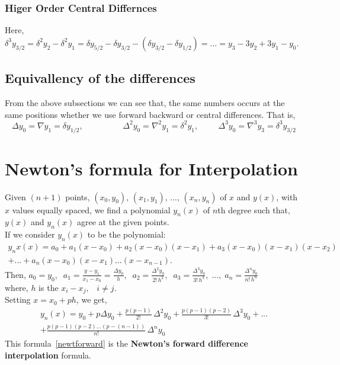 \documentclass[aima203_lecturenotes_ku.tex]{subfiles}
\begin{document}
\subsubsection{Higer Order Central Differnces}
Here, $\delta ^3 y_{3/2} = \delta ^2 y_2 - \delta ^2 y_1 = \delta y_{5/2} - \delta y_{3/2}-(\delta y_{3/2} - \delta y_{1/2}) = ... = y_3 - 3y_2 + 3y_1- y_0$.

\subsection{Equivallency of the differences}
From the above subsections we can see that, the same numbers occurs at the same positions whether we use forward backward or central differences. That is, $$\Delta y_0 = \nabla y_1 = \delta y_{1/2}, \hspace{2cm} \Delta^2 y_0 = \nabla ^2 y_1 = \delta ^2 y_1, \hspace{1cm} \Delta ^3 y_0 = \nabla ^3 y_3 = \delta ^3 y_{3/2} $$

\section{Newton's formula for Interpolation}
Given $(n+1)$ points, $(x_0,y_0), \, (x_1,y_1), \, ..., \, (x_n,y_n)$ of $x$ and $y(x)$, with $x$ values equally spaced, we find a polynomial $y_n(x)$ of $n$th degree such that, $y(x)$ and $y_n(x)$ agree at the given points. \\
If we consider $y_n(x)$ to be the polynomial:
\begin{equation}
  \begin{gathered}
  y_nx(x)= a_0 +a_1(x-x_0) +a_2(x-x_0)(x-x_1)+a_3(x-x_0)(x-x_1)(x-x_2) \\[1mm]
  + ... + a_n(x-x_0)(x-x_1)...(x-x_{n-1}).
  \end{gathered}
\end{equation}
\vspace{2mm}
Then, $\displaystyle a_0 = y_0, \;\; a_1=\frac{y-y_1}{x_1-x_0}=\frac{\Delta y_0}{h}, \;\; a_2 = \frac{\Delta ^2 y_0}{2!\, h^2}, \;\; a_3 = \frac{\Delta ^3 y_0}{3!\, h^3}, \;..., \;  a_n = \frac{\Delta ^n y_0}{n!\, h^n} $ \\[1mm]
where, $h$ is the $x_i - x_j, \;\;\; i \neq j$. \\
Setting $x=x_0 +ph$, we get,
\begin{equation}
  \label{newtforward}
 \begin{gathered}
  y_n(x) = y_0 + p \Delta y_0 + \frac{p(p-1)}{2!}\, \Delta ^2 y_0 + \frac{p(p-1)(p-2)}{3!}\, \Delta ^3 y_0 + ... \\[1mm]
  + \frac{p(p-1)(p-2)...(p-(n-1))}{n!}\, \Delta ^n y_0
\end{gathered}
\end{equation}
This formula~\ref{newtforward} is the \textbf{Newton's forward difference interpolation} formula.
\end{document}
